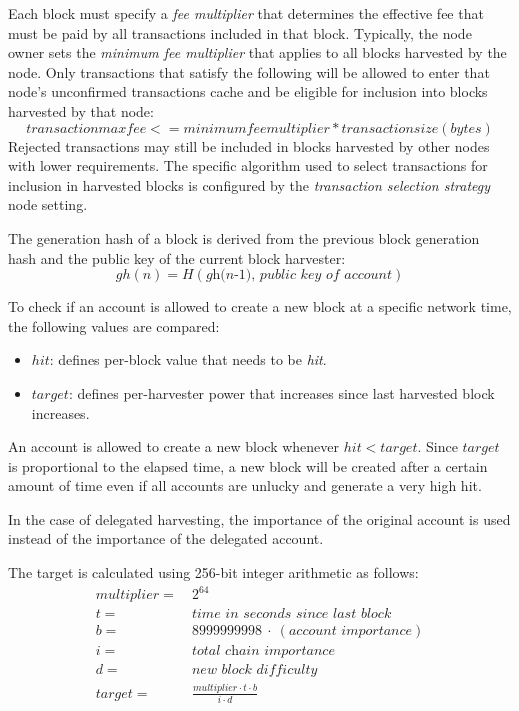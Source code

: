 
Each block must specify a \textit{fee multiplier} that determines the effective fee that must be paid by all transactions included in that block.
Typically, the node owner sets the \textit{minimum fee multiplier} that applies to all blocks harvested by the node.
Only transactions that satisfy the following will be allowed to enter that node's unconfirmed transactions cache and be eligible for inclusion into blocks harvested by that node:
$$transaction max fee <= minimum fee multiplier * transaction size (bytes)$$
Rejected transactions may still be included in blocks harvested by other nodes with lower requirements.
The specific algorithm used to select transactions for inclusion in harvested blocks is configured by the \textit{transaction selection strategy} node setting.


The generation hash of a block is derived from the previous block generation hash and the public key of the current block harvester:
\begin{equation}
\tag{generation hash} \mathit{gh(n)} = H(\textit{gh(n-1), public key of account})
\end{equation}

To check if an account is allowed to create a new block at a specific network time, the following values are compared:
\begin{itemize}
\item{ $hit$: defines per-block value that needs to be \textit{hit}.}
\item{ $target$: defines per-harvester power that increases since last harvested block increases.}
\end{itemize}
An account is allowed to create a new block whenever $\mathit{hit} < \mathit{target}$.
Since $\mathit{target}$ is proportional to the elapsed time, a new block will be created after a certain amount of time even if all accounts are unlucky and generate a very high hit.

In the case of delegated harvesting, the importance of the original account is used instead of the importance of the delegated account.

The target is calculated using 256-bit integer arithmetic as follows:
\begin{align*}
multiplier = \: & 2^{64} \\
t = \: & \textit{time in seconds since last block} \\
b = \: & 8999999998 \: \cdot \: (\textit{account importance}) \\
i = \: & \textit{total chain importance} \\
d = \: & \textit{new block difficulty} \\
target = \: & \frac{multiplier \cdot t \cdot b}{i \cdot d}
\end{align*}

